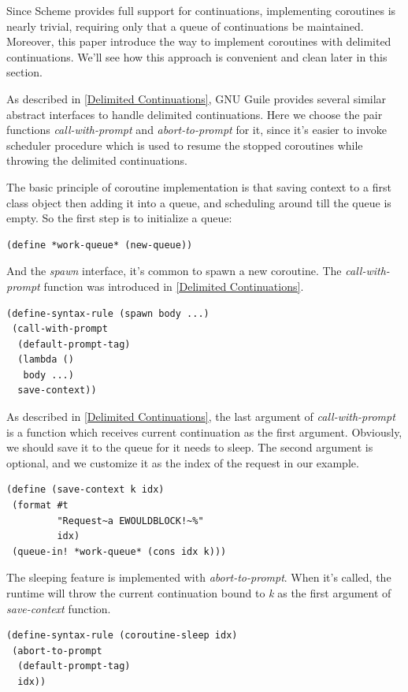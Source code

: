 \documentclass[preprint,numbers,numberedpars,10pt]{sigplanconf}
\begin{document}
Since Scheme provides full support for continuations, implementing coroutines is nearly trivial, requiring only that a queue of continuations
be maintained. Moreover, this paper introduce the way to implement coroutines with delimited continuations. We'll see how this approach is
convenient and clean later in this section.

As described in \ref{Delimited Continuations}, GNU Guile provides several similar abstract interfaces to handle delimited continuations.
Here we choose the pair functions {\it call-with-prompt} and {\it abort-to-prompt} for it, since it's easier to invoke scheduler procedure
which is used to resume the stopped coroutines while throwing the delimited continuations.

The basic principle of coroutine implementation is that saving context to a first class object then adding it into a queue, and scheduling
around till the queue is empty. So the first step is to initialize a queue:

\begin{lstlisting}
(define *work-queue* (new-queue))
\end{lstlisting}

And the {\it spawn} interface, it's common to spawn a new coroutine. The {\it call-with-prompt} function was introduced in
\ref{Delimited Continuations}.

\begin{lstlisting}
(define-syntax-rule (spawn body ...)
 (call-with-prompt
  (default-prompt-tag)
  (lambda ()
   body ...)
  save-context))
\end{lstlisting}

As described in \ref{Delimited Continuations}, the last argument of {\it call-with-prompt} is a function which receives current continuation
as the first argument. Obviously, we should save it to the queue for it needs to sleep. The second argument is optional, and we customize it
as the index of the request in our example.

\begin{lstlisting}
(define (save-context k idx)
 (format #t
         "Request~a EWOULDBLOCK!~%"
         idx)
 (queue-in! *work-queue* (cons idx k)))
\end{lstlisting}

The sleeping feature is implemented with {\it abort-to-prompt}. When it's called, the runtime will throw the current continuation bound to
{\it k} as the first argument of {\it save-context} function.

\begin{lstlisting}
(define-syntax-rule (coroutine-sleep idx)
 (abort-to-prompt
  (default-prompt-tag)
  idx))
\end{lstlisting}
\end{document}
